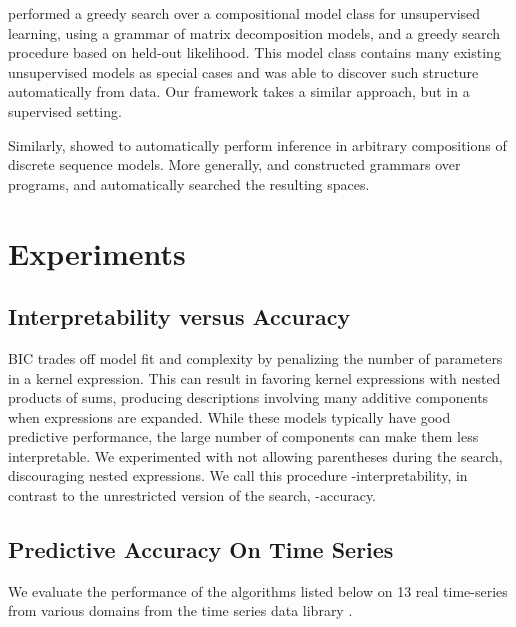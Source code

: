 \citet{grosse2012exploiting} performed a greedy search over a compositional model class for unsupervised learning, using a grammar of matrix decomposition models, and a greedy search procedure based on held-out likelihood.
This model class contains many existing unsupervised models as special cases and was able to discover such structure automatically from data.
Our framework takes a similar approach, but in a supervised setting.

Similarly, \citet{christian-thesis} showed to automatically perform inference in arbitrary compositions of discrete sequence models.
More generally, \citet{dechter2013bootstrap} and \citet{liang2010learning} constructed grammars over programs, and automatically searched the resulting spaces.




\section{Experiments}
\label{sec:numerical}

\subsection{Interpretability versus Accuracy}

BIC trades off model fit and complexity by penalizing the number of parameters in a kernel expression.
This can result in \procedurename{} favoring kernel expressions with nested products of sums, producing descriptions involving many additive components when expressions are expanded.
While these models typically have good predictive performance, the large number of components can make them less interpretable.
We experimented with not allowing parentheses during the search, discouraging nested expressions.
We call this procedure \procedurename{}-interpretability, in contrast to the unrestricted version of the search, \procedurename{}-accuracy.


\subsection{Predictive Accuracy On Time Series}



We evaluate the performance of the algorithms listed below on 13 real time-series from various domains from the time series data library \citep{TSDL}.



